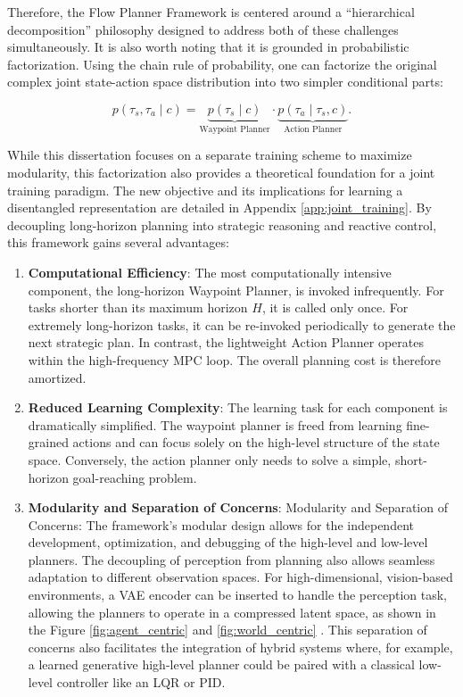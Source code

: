 Therefore, the Flow Planner Framework is centered around a “hierarchical decomposition” philosophy designed to address both of these challenges simultaneously. It is also worth noting that it is grounded in probabilistic factorization. Using the chain rule of probability, one can factorize the original complex joint state-action space distribution into two simpler conditional parts:

\begin{equation}
	p(\tau_s, \tau_a \mid c) = \underbrace{p(\tau_s \mid c)}_{\text{Waypoint Planner}} \cdot \underbrace{p(\tau_a \mid \tau_s , c)}_{\text{Action Planner}}.
\end{equation}

While this dissertation focuses on a separate training scheme to maximize modularity, this factorization also provides a theoretical foundation for a joint training paradigm. The new objective and its implications for learning a disentangled representation are detailed in Appendix \ref{app:joint_training}. By decoupling long-horizon planning into strategic reasoning and reactive control, this framework gains several advantages:
\begin{enumerate}
	\item \textbf{Computational Efficiency}: The most computationally intensive component, the long-horizon Waypoint Planner, is invoked infrequently. For tasks shorter than its maximum horizon $H$, it is called only once. For extremely long-horizon tasks, it can be re-invoked periodically to generate the next strategic plan. In contrast, the lightweight Action Planner operates within the high-frequency MPC loop. The overall planning cost is therefore amortized.
	\item \textbf{Reduced Learning Complexity}: The learning task for each component is dramatically simplified. The waypoint planner is freed from learning fine-grained actions and can focus solely on the high-level structure of the state space. Conversely, the action planner only needs to solve a simple, short-horizon goal-reaching problem.
	\item \textbf{Modularity and Separation of Concerns}: Modularity and Separation of Concerns: The framework’s modular design allows for the independent development, optimization, and debugging of the high-level and low-level planners. The decoupling of perception from planning also allows seamless adaptation to different observation spaces. For high-dimensional, vision-based environments, a VAE encoder \cite{kingmaAutoEncodingVariationalBayes2022a} can be inserted to handle the perception task, allowing the planners to operate in a compressed latent space, as shown in the Figure \ref{fig:agent_centric} and \ref{fig:world_centric} \cite{haWorldModels2018}. This separation of concerns also facilitates the integration of hybrid systems where, for example, a learned generative high-level planner could be paired with a classical low-level controller like an LQR or PID.
\end{enumerate}

